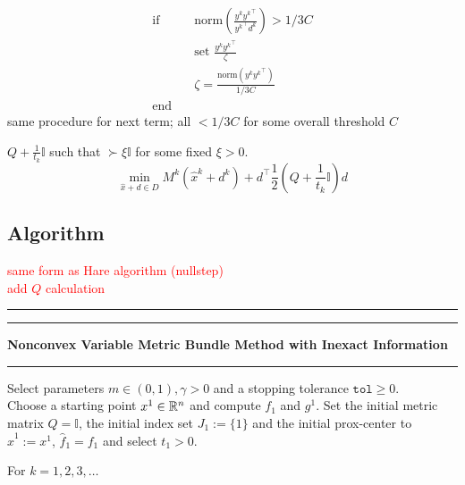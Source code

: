 \begin{align}
	\text{if} &\quad \text{norm}\left(\frac{y^k{y^k}^{\top}}{{y^k}^{\top}d^k}\right) > 1/3C \\
	&\quad \text{set } \frac{y^k{y^k}^{\top}}{\zeta} \\
	&\quad \zeta = \frac{\text{norm}\left(y^k{y^k}^{\top}\right)}{1/3C} \\
	\text{end} &
\end{align}
same procedure for next term; all \(<1/3C\) for some overall threshold \(C\) 

\(Q+\frac{1}{t_k}\mathbb{I}\) such that \(\succ \xi \mathbb{I}\) for some fixed \(\xi > 0\). \\

\begin{equation}
	\min_{\hat{x}+d \in D} M^k(\hat{x}^k+d^k)+d^{\top}\frac{1}{2}\left(Q+\frac{1}{t_k}\mathbb{I}\right)d	
\label{Q_subprob}
\end{equation}
 

\subsection{Algorithm}

\textcolor{red}{same form as Hare algorithm (nullstep)\\
add \(Q\) calculation}
\vspace{1em}

\hrule  \vspace{0.4ex} \hrule
\vspace{1ex}
\textbf{Nonconvex Variable Metric Bundle Method with Inexact Information}
\vspace{1ex}
\hrule
\vspace{1ex}
Select parameters \( m \in (0,1), \gamma > 0 \) and a stopping tolerance \( \mathtt{tol} \geq 0\). \\
Choose a starting point \(x^1 \in \mathbb{R}^n\) and compute \(f_1\) and \(g^1\). Set the initial metric matrix \(Q = \mathbb{I}\), the initial index set \(J_1:=\{1\}\) and the initial prox-center to \(\hat{x}^1 := x^1\), \(\hat{f}_1 = f_1\) and select \(t_1 > 0\).

For \(k = 1,2,3,  \dotsc \)   

